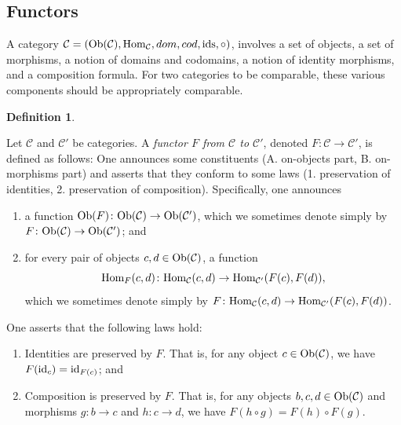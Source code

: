 \documentclass{book}
\def\tn{\textnormal}
\def\mc{\mathcal}
\def\Hom{\tn{Hom}}
\def\Ob{\tn{Ob}}
\def\hsp{\hspace{.3in}}
\def\to{\rightarrow}
\def\taking{\colon}
\def\id{\tn{id}}
\def\ids{\tn{ids}}
\def\mcC{\mc{C}}
\theoremstyle{remark}
\theoremstyle{definition}
\newtheorem{definition}[subsubsection]{Definition}
\begin{document}

\subsection{Functors}

A category $\mcC=(\Ob(\mcC),\Hom_\mcC,dom,cod,\ids,\circ)$, involves a set of objects, a set of morphisms, a notion of domains and codomains, a notion of identity morphisms, and a composition formula. For two categories to be comparable, these various components should be appropriately comparable.

\begin{definition}\label{def:functor}

Let $\mcC$ and $\mcC'$ be categories. A {\em functor $F$ from $\mcC$ to $\mcC'$}, denoted $F\taking\mcC\to\mcC'$, is defined as follows: One announces some constituents (A. on-objects part, B. on-morphisms part) and asserts that they conform to some laws (1. preservation of identities, 2. preservation of composition). Specifically, one announces
\begin{enumerate}[\hsp A.]
\item a function $\Ob(F)\taking\Ob(\mcC)\to\Ob(\mcC')$, which we sometimes denote simply by $F\taking\Ob(\mcC)\to\Ob(\mcC')$; and
\item for every pair of objects $c,d\in\Ob(\mcC)$, a function $$\Hom_F(c,d)\taking\Hom_\mcC(c,d)\to\Hom_{\mcC'}(F(c),F(d)),$$ which we sometimes denote simply by $F\taking\Hom_\mcC(c,d)\to\Hom_{\mcC'}(F(c),F(d))$.
\end{enumerate}
One asserts that the following laws hold:
\begin{enumerate}[\hsp 1.]
\item Identities are preserved by $F$. That is, for any object $c\in\Ob(\mcC)$, we have $F(\id_c)=\id_{F(c)}$; and
\item Composition is preserved by $F$. That is, for any objects $b,c,d\in\Ob(\mcC)$ and morphisms $g\taking b\to c$ and $h\taking c\to d$, we have $F(h\circ g)=F(h)\circ F(g)$.
\end{enumerate}
\end{definition}
\end{document}
